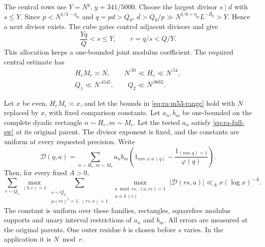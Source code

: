 The central rows use \(Y=N^y\), \(y=341/5000\).
Choose the largest divisor \(s\mid d\) with \(s\le Y\).
Since \(p<N^{1/3-\eta_{\mathrm m}}\) and \(q=pd>Q_0\),
\(d>Q_0/p\gg N^{1/6+\eta_{\mathrm m}}L^{-B_0}>Y\).
Hence a next divisor exists.
The cube gates control adjacent divisors and give
\begin{equation}\label{eq:ra-central-selector}
 \frac{Yq}{Q}<s\le Y,\qquad r=q/s<Q/Y.
\end{equation}
This allocation keeps a one-bounded joint modulus coefficient.
The required central estimate has
\begin{equation}\label{eq:ra-m53-range}
\begin{gathered}
 H_{\mathrm c}M_{\mathrm c}\asymp N,\qquad
 N^{.50}\ll H_{\mathrm c}\ll N^{.54},\\
 Q_1\ll N^{.4545},\qquad Q_2\ll N^{.0682}.
\end{gathered}
\end{equation}
\begin{lemma}\label{hyp:ra-central}
Let \(x\) be even, \(H_{\mathrm c}M_{\mathrm c}\asymp x\), and let the
bounds in \eqref{eq:ra-m53-range} hold with \(N\) replaced by \(x\), with
fixed comparison constants. Let \(a_n,b_m\) be one-bounded on the complete
dyadic rectangle \(n\sim H_{\mathrm c},m\sim M_{\mathrm c}\). Let the
tested \(a_n\) satisfy \eqref{eq:ra-full-sw} at its original parent.
The divisor exponent is fixed, and the constants are uniform at every requested
precision. Write
\[
 \mathcal D(q,a)=\sum_{n\sim H_{\mathrm c},m\sim M_{\mathrm c}}a_nb_m
 \left(1_{nm\equiv a\ (q)}-\frac{1_{(nm,q)=1}}{\varphi(q)}\right).
\]
Then, for every fixed \(A>0\),
\begin{equation}\label{eq:ra-m53-input}
 \sum_{r\sim Q_1}\max_{(b,r)=1}
 \sum_{\substack{s\sim Q_2\\\mu(rs)^2=1,\ (rs,x)=1}}
 \max_{\substack{a\bmod rs,\ (a,rs)=1\\a\equiv b\ (r)}}
       |\mathcal D(rs,a)|\ll_A x(\log x)^{-A}.
\end{equation}
The constant is uniform over these families, rectangles, squarefree
modulus supports and unary interval restrictions of \(a_n\) and \(b_m\).
All errors are measured at the original parents. One outer residue
\(b\) is chosen before \(s\) varies.
In the application it is
\(N\bmod r\).
\end{lemma}
